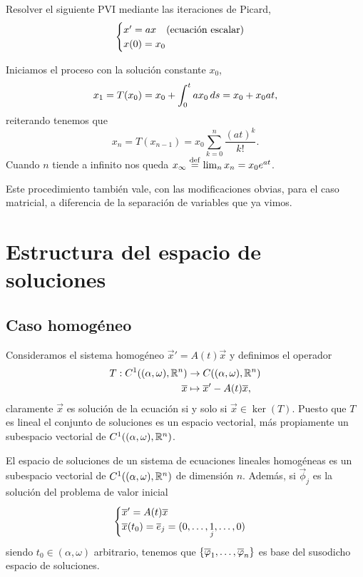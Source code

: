 \documentclass[../ecuaciones_diferenciales.tex]{subfiles}
\begin{document}
\begin{example}
	Resolver el siguiente PVI mediante las iteraciones de Picard,
	\[\begin{cases}x' = ax \quad \text{(ecuación escalar)} \\
			x(0) = x_0\end{cases}\]
\end{example}

\begin{solution}
	Iniciamos el proceso con la solución constante \(x_0\),
	\[x_1 = T(x_0) = x_0 + \int_0^t a x_0 \mathop{d\!} s = x_0 + x_0 a t,\]
	reiterando tenemos que
	\[x_n = T(x_{n - 1}) = x_0 \sum_{k = 0}^n \frac{(at)^k}{k!}.\]
	Cuando \(n\) tiende a infinito nos queda 
	\(x_\infty \overset{\operatorname{def}}{=} \lim_n x_n = x_0 e^{at}\).
\end{solution}

\begin{remark}
	Este procedimiento también vale, con las modificaciones obvias, para el caso
	matricial, a diferencia de la separación de variables que ya vimos.
\end{remark}

\section{Estructura del espacio de soluciones}

\subsection{Caso homogéneo}

Consideramos el sistema homogéneo \(\vec{x}' = A(t) \vec{x}\) y definimos el
operador 
\begin{align*}
	T : C^1((\alpha, \omega), \mathbb{R}^n) & \to C((\alpha, \omega), \mathbb{R}^n) \\
							\overline{x} & \mapsto \overline{x}' - A(t)\overline{x},
\end{align*}
claramente \(\vec{x}\) es solución de la ecuación si y solo si 
\(\vec{x} \in \ker(T)\).
Puesto que \(T\) es lineal el conjunto de soluciones es un espacio vectorial,
más propiamente un subespacio vectorial de \(C^1((\alpha, \omega), \mathbb{R}^n)\).

\begin{theorem}
	El espacio de soluciones de un sistema de ecuaciones lineales homogéneas es
	un subespacio vectorial de \(C^1((\alpha, \omega), \mathbb{R}^n)\) de dimensión
	\(n\). Además, si \(\vec{\phi}_j\) es la solución del problema de valor 
	inicial
	\[\begin{cases}
		\overline{x}' = A(t)\overline{x} \\
		\overline{x}(t_0) = \overline{e}_j = (0, \dots, \underset{j}{1}, \dots, 0)\end{cases}\]
	siendo \(t_0 \in (\alpha, \omega)\) arbitrario, tenemos que
	\(\set{\vec{\phi}_1, \dots, \vec{\phi}_n}\) es base del susodicho 
	espacio de soluciones.
\end{theorem}
\end{document}
